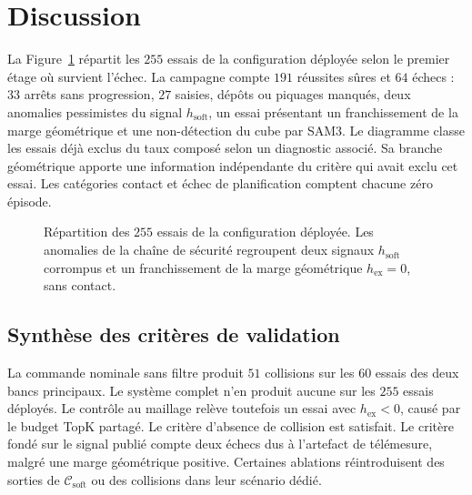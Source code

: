 \FloatBarrier

\section{Discussion}\label{sec:res_discussion}
La Figure~\ref{fig:res_sankey} répartit les $255$ essais de la configuration déployée selon le premier étage où survient l'échec. La campagne compte $191$ réussites sûres et $64$ échecs : $33$ arrêts sans progression, $27$ saisies, dépôts ou piquages manqués, deux anomalies pessimistes du signal $h_{\mathrm{soft}}$, un essai présentant un franchissement de la marge géométrique et une non-détection du cube par SAM3. Le diagramme classe les essais déjà exclus du taux composé selon un diagnostic associé. Sa branche géométrique apporte une information indépendante du critère qui avait exclu cet essai. Les catégories contact et échec de planification comptent chacune zéro épisode.

\begin{figure}[!htbp]
    \centering
    
    \caption[Répartition des essais et analyse des échecs]{Répartition des $255$ essais de la configuration déployée. Les anomalies de la chaîne de sécurité regroupent deux signaux $h_{\mathrm{soft}}$ corrompus et un franchissement de la marge géométrique $h_{\mathrm{ex}}=0$, sans contact.}
    \label{fig:res_sankey}
\end{figure}

\subsection*{Synthèse des critères de validation}
La commande nominale sans filtre produit $51$ collisions sur les $60$ essais des deux bancs principaux. Le système complet n'en produit aucune sur les $255$ essais déployés. Le contrôle au maillage relève toutefois un essai avec $h_{\mathrm{ex}}<0$, causé par le budget TopK partagé. Le critère d'absence de collision est satisfait. Le critère fondé sur le signal publié compte deux échecs dus à l'artefact de télémesure, malgré une marge géométrique positive. Certaines ablations réintroduisent des sorties de $\mathcal{C}_{\mathrm{soft}}$ ou des collisions dans leur scénario dédié.

